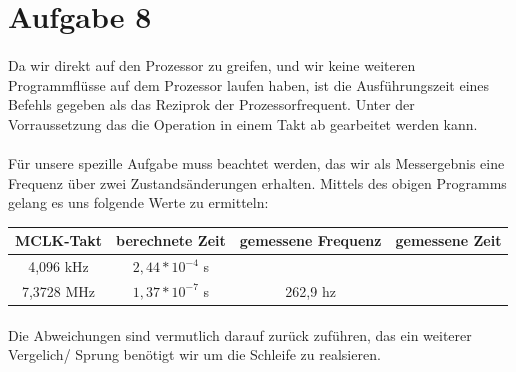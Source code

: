 \section{Aufgabe 8}

\paragraph*{}
Da wir direkt auf den Prozessor zu greifen, und wir keine weiteren Programmflüsse auf dem Prozessor laufen haben, ist die Ausführungszeit eines Befehls gegeben als das Reziprok der Prozessorfrequent. Unter der Vorraussetzung das die Operation in einem Takt ab gearbeitet werden kann. 



\paragraph*{}
Für unsere spezille Aufgabe muss beachtet werden, das wir als Messergebnis eine Frequenz über zwei Zustandsänderungen erhalten.
Mittels des obigen Programms gelang es uns folgende Werte zu ermitteln: \\

\begin{tabular}{ c | c | c | c}\hline \hline
MCLK-Takt & berechnete Zeit & gemessene Frequenz & gemessene Zeit \\ \hline
4,096 kHz & $ 2,44 * 10^{-4} $ s &  & \\ \hline
7,3728 MHz & $ 1,37 * 10^{-7} $ s  & 262,9 hz & \\ \hline
\end{tabular}

\paragraph*{}
Die Abweichungen sind vermutlich darauf zurück zuführen, das ein weiterer Vergelich/ Sprung benötigt wir um die Schleife zu realsieren.

